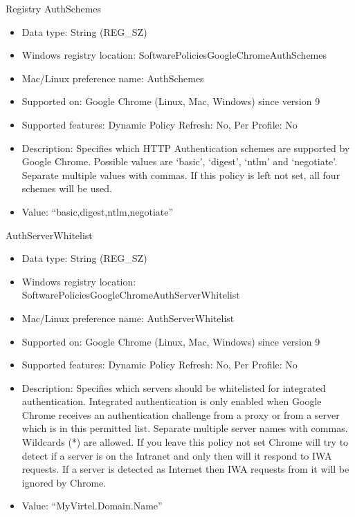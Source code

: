 \documentclass[letterpaper,10pt,english]{sphinxmanual}
\begin{document}
Registry AuthSchemes
\begin{itemize}
\item {} 
Data type: String (REG\_SZ)

\item {} 
Windows registry location: SoftwarePoliciesGoogleChromeAuthSchemes

\item {} 
Mac/Linux preference name: AuthSchemes

\item {} 
Supported on: Google Chrome (Linux, Mac, Windows) since version 9

\item {} 
Supported features: Dynamic Policy Refresh: No, Per Profile: No

\item {} 
Description: Specifies which HTTP Authentication schemes are supported by Google Chrome. Possible values are ‘basic’, ‘digest’, ‘ntlm’ and ‘negotiate’. Separate multiple values with commas. If this policy is left not set, all four schemes will be used.

\item {} 
Value: “basic,digest,ntlm,negotiate”

\end{itemize}

AuthServerWhitelist
\begin{itemize}
\item {} 
Data type: String (REG\_SZ)

\item {} 
Windows registry location: SoftwarePoliciesGoogleChromeAuthServerWhitelist

\item {} 
Mac/Linux preference name: AuthServerWhitelist

\item {} 
Supported on: Google Chrome (Linux, Mac, Windows) since version 9

\item {} 
Supported features: Dynamic Policy Refresh: No, Per Profile: No

\item {} 
Description: Specifies which servers should be whitelisted for integrated authentication. Integrated authentication is only enabled when Google Chrome receives an authentication challenge from a proxy or from a server which is in this permitted list. Separate multiple server names with commas. Wildcards (*) are allowed. If you leave this policy not set Chrome will try to detect if a server is on the Intranet and only then will it respond to IWA requests. If a server is detected as Internet then IWA requests from it will be ignored by Chrome.

\item {} 
Value: “MyVirtel.Domain.Name”

\end{itemize}
\end{document}
